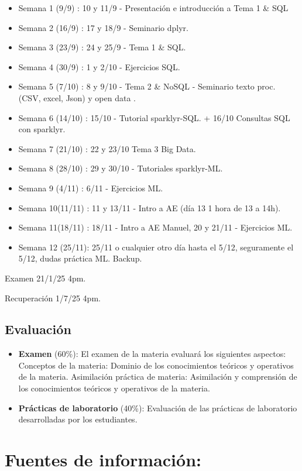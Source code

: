 \documentclass[
]{book}
\begin{document}
\begin{itemize}
\item
  Semana 1 (9/9) : 10 y 11/9 - Presentación e introducción a Tema 1 \& SQL
\item
  Semana 2 (16/9) : 17 y 18/9 - Seminario dplyr.
\item
  Semana 3 (23/9) : 24 y 25/9 - Tema 1 \& SQL.
\item
  Semana 4 (30/9) : 1 y 2/10 - Ejercicios SQL.
\item
  Semana 5 (7/10) : 8 y 9/10 - Tema 2 \& NoSQL - Seminario texto proc. (CSV, excel, Json) y open data .
\item
  Semana 6 (14/10) : 15/10 - Tutorial sparklyr-SQL. + 16/10 Consultas SQL con sparklyr.
\item
  Semana 7 (21/10) : 22 y 23/10 Tema 3 Big Data.
\item
  Semana 8 (28/10) : 29 y 30/10 - Tutoriales sparklyr-ML.
\item
  Semana 9 (4/11) : 6/11 - Ejercicios ML.
\item
  Semana 10(11/11) : 11 y 13/11 - Intro a AE (día 13 1 hora de 13 a 14h).
\item
  Semana 11(18/11) : 18/11 - Intro a AE Manuel, 20 y 21/11 - Ejercicios ML.
\item
  Semana 12 (25/11): 25/11 o cualquier otro día hasta el 5/12, seguramente el 5/12, dudas práctica ML. Backup.
\end{itemize}

Examen 21/1/25 4pm.

Recuperación 1/7/25 4pm.

\subsection{Evaluación}\label{evaluaciuxf3n}

\begin{itemize}
\item
  \textbf{Examen} (60\%): El examen de la materia evaluará los siguientes aspectos:
  Conceptos de la materia: Dominio de los conocimientos teóricos y operativos de la materia.
  Asimilación práctica de materia: Asimilación y comprensión de los conocimientos teóricos y operativos de la materia.
\item
  \textbf{Prácticas de laboratorio} (40\%): Evaluación de las prácticas de laboratorio desarrolladas por los estudiantes.
\end{itemize}

\section{Fuentes de información:}\label{fuentes-de-informaciuxf3n}
\end{document}
